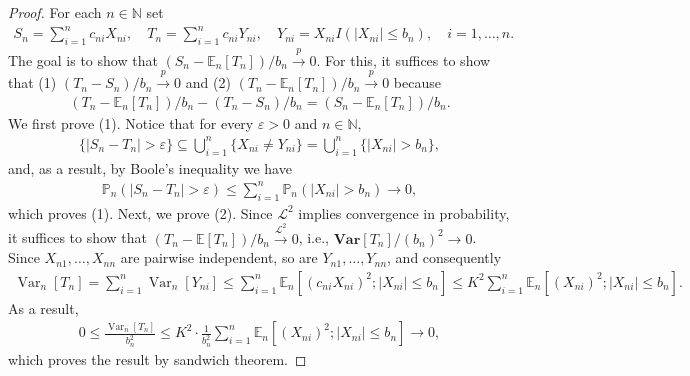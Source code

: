 \documentclass[11pt]{article}
\def\mc#1{\mathcal{#1}} %
\def\E{\mathbb{E}} %
\def\mc#1{\mathcal{#1}}
\def\var#1{\mathrm{Var}(#1)} %
\def\P{\mathbb{P}}
\def\var{\mathbf{Var}}
\def\naturals{\mathbb{N}}
\def\cp{\overset{p}{\to}}
\def\clt{\overset{\mathcal{L}^2}{\to}}
\DeclareMathOperator{\Var}{Var} %
\theoremstyle{definition}
\begin{document}
\begin{proof}
  For each $n\in \naturals$ set
    \begin{align*}
      S_n = \sum_{i=1}^n c_{ni} X_{ni}, \quad T_n = \sum_{i=1}^n c_{ni} Y_{ni},
      \quad Y_{ni} = X_{ni} I(|X_{ni}|\leq b_n), \quad i = 1, \ldots, n.
    \end{align*}
   The goal is to show that  $(S_n- \E_n[T_n])/b_n \cp 0$. For this, it suffices to show that (1) $(T_n - S_n)/b_n \cp 0$ and (2) $(T_n - \E_n[T_n])/b_n \cp 0$ because
    \begin{align*}
      (T_n - \E_n[T_n])/b_n -(T_n - S_n)/b_n = (S_n- \E_n[T_n])/b_n .
    \end{align*}
     We first prove (1). Notice that for every $\varepsilon > 0$ and $n\in \naturals$,
    \begin{align*}
      \{|S_n- T_n| > \varepsilon\}\subseteq \bigcup_{i=1}^n \{X_{ni}\neq Y_{ni}\}
      = \bigcup_{i=1}^n \{|X_{ni}|>b_n\},
    \end{align*}
    and, as a result, by Boole's inequality we have
    \begin{align*}
      \P_n (|S_n - T_n|>\varepsilon) \leq \sum_{i=1}^n \P_n(|X_{ni}|>b_n) \to 0,
    \end{align*}
    which proves (1). Next, we prove (2). Since $\mc{L}^2$ implies convergence in probability, it suffices to show that $(T_n-\E[T_n])/b_n \clt 0$, i.e., $\var[T_n]/(b_n)^2 \to 0$. Since $X_{n1}, \ldots, X_{nn}$ are pairwise independent, so are $Y_{n1}, \ldots, Y_{nn}$, and consequently
    \begin{align*}
      \Var_n[T_n]=\sum_{i=1}^n \Var_n[Y_{ni}] \leq \sum_{i=1}^n \E_n[(c_{ni}X_{ni})^2; |X_{ni}|\leq b_n] \leq K^2\sum_{i=1}^n \E_n[(X_{ni})^2; |X_{ni}|\leq b_n].
    \end{align*}
    As a result,
    \begin{align*}
    0\leq   \frac{\Var_n[T_n]}{b_n^2}\leq K^2 \cdot  \frac{1}{b_n^2}\sum_{i=1}^n \E_n[(X_{ni})^2; |X_{ni}|\leq b_n] \to 0,
    \end{align*}
    which proves the result by sandwich theorem.
\end{proof}
\end{document}
